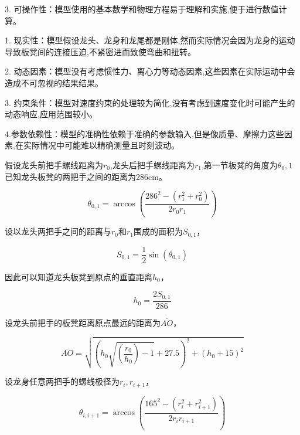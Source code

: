 3. 可操作性：模型使用的基本数学和物理方程易于理解和实施,便于进行数值计算。

1. 现实性：模型假设龙头、龙身和龙尾都是刚体,然而实际情况会因为龙身的运动导致板凳间的连接压迫,不紧密进而致使弯曲和扭转。

2. 动态因素：模型没有考虑惯性力、离心力等动态因素,这些因素在实际运动中会造成不可忽视的结果结果。

3. 约束条件：模型对速度约束的处理较为简化,没有考虑到速度变化时可能产生的动态响应,应用范围较小。

4.参数依赖性：模型的准确性依赖于准确的参数输入,但是像质量、摩擦力这些因素,在实际情况中可能难以精确测量且时刻波动。





假设龙头前把手螺线距离为$r_0$,龙头后把手螺线距离为$r_1$,第一节板凳的角度为$\theta_0,1$已知龙头板凳的两把手之间的距离为286cm。

\begin{equation}
	\theta_{0,1} = \arccos\left(\frac{286^2 - (r_1^2 + r_0^2)}{2r_0r_1}\right)
\end{equation}

设以龙头两把手之间的距离与$r_0$和$r_1$围成的面积为$S_{0,1}$，

\begin{equation}
	S_{0,1} = \frac{1}{2} \sin(\theta_{0,1})
\end{equation}

因此可以知道龙头板凳到原点的垂直距离$h_0$，

\begin{equation}
	h_0 = \frac{2S_{0,1}}{286}
\end{equation}

设龙头前把手的板凳距离原点最远的距离为$\overline{AO}$，

\begin{equation}
	\overline{AO} = \sqrt{\left(h_0 \sqrt{\left(\frac{r_0}{h_0}\right) - 1} + 27.5\right)^2 + (h_0 + 15)^2}
\end{equation}

设龙身任意两把手的螺线极径为$r_i, r_{i+1}$，

\begin{equation}
	\theta_{i,i+1} = \arccos\left(\frac{165^2 - (r_i^2 + r_{i+1}^2)}{2r_ir_{i+1}}\right)
\end{equation}

